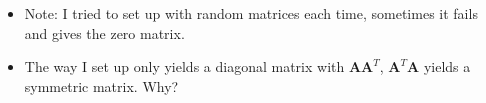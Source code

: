 \begin{itemize}
\begin{enumerate}

    \begin{itemize}
      \item Note: I tried to set up with random matrices each time, sometimes it
        fails and gives the zero matrix.
      \item The way I set up only yields a diagonal matrix with
      \(\bm{A}\bm{A}^T \), \(\bm{A}^T \bm{A} \) yields a symmetric matrix. Why?
    \end{itemize}

  \end{enumerate}
\end{itemize}

